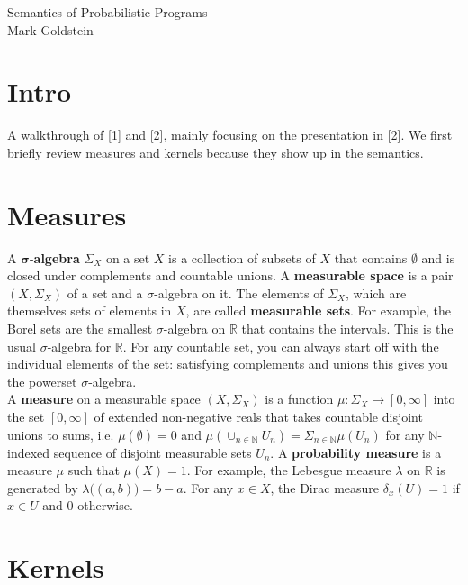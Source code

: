 \documentclass[11pt]{article}
\theoremstyle{definition}
\theoremstyle{plain}
\renewcommand{\b}[1]{\mathbb{#1}}
\begin{document}
\begin{center}
Semantics of Probabilistic Programs\\
Mark Goldstein
\end{center}

\section{Intro}

\noindent A walkthrough of [1] and [2], mainly focusing on the presentation 
in [2]. We first briefly review measures and kernels because
they show up in the semantics.

\section{Measures}

\noindent A $\mathbf{\sigma}$-\textbf{algebra} $\Sigma_X$ on a set $X$ is a collection
of subsets of $X$ that contains $\emptyset$ and is closed under complements
and countable unions. A \textbf{measurable space} is a pair $(X,\Sigma_X)$ of
a set and a $\sigma$-algebra on it. The elements of $\Sigma_X$, which are themselves
sets of elements in $X$, are called \textbf{measurable sets}.
For example, the Borel sets are the smallest $\sigma$-algebra on $\b{R}$ that
contains the intervals. This is the usual $\sigma$-algebra for $\b{R}$. For any countable
set, you can always start off with the individual elements of the set: satisfying
complements and unions this gives you the powerset $\sigma$-algebra.\\

\noindent A \textbf{measure} on a measurable space $(X,\Sigma_X)$ is a function
$\mu: \Sigma_X \rightarrow [0,\infty]$ into the set $[0,\infty]$ of extended
non-negative reals that takes countable disjoint unions to sums, i.e. $\mu(\emptyset)=0$
and $\mu(\cup_{n \in \b{N}} U_n) = \Sigma_{n \in \b{N}} \mu(U_n)$ 
for any $\b{N}$-indexed sequence of disjoint measurable sets $U_n$.
A \textbf{probability measure} is a measure $\mu$ such that $\mu(X)=1$.
For example, the Lebesgue measure $\lambda$ on $\b{R}$ is generated by
$\lambda \Big( (a,b) \Big) = b-a$. For any $x \in X$, the Dirac measure 
$\delta_x(U) = 1$ if $x \in U$ and $0$ otherwise.\\

\section{Kernels} 
\end{document}
